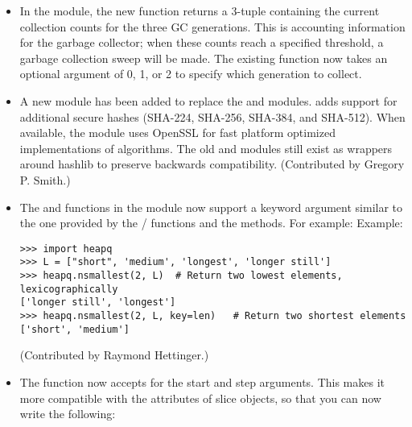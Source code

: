 \documentclass{howto}
\begin{document}
\begin{itemize}






\item In the  module, the new  function
returns a 3-tuple containing the current collection counts for the
three GC generations.  This is accounting information for the garbage
collector; when these counts reach a specified threshold, a garbage
collection sweep will be made.  The existing 
function now takes an optional  argument of 0, 1, or 2
to specify which generation to collect.

\item A new  module has been added to replace the
 and  modules.   adds support
for additional secure hashes (SHA-224, SHA-256, SHA-384, and SHA-512).
When available, the module uses OpenSSL for fast platform optimized
implementations of algorithms.  The old  and 
modules still exist as wrappers around hashlib to preserve backwards
compatibility.  (Contributed by Gregory P. Smith.)

\item The  and 
 functions in the  module 
now support a  keyword argument similar to the one
provided by the / functions
and the  methods.  For example:
Example:

\begin{verbatim}
>>> import heapq
>>> L = ["short", 'medium', 'longest', 'longer still']
>>> heapq.nsmallest(2, L)  # Return two lowest elements, lexicographically
['longer still', 'longest']
>>> heapq.nsmallest(2, L, key=len)   # Return two shortest elements
['short', 'medium']
\end{verbatim}

(Contributed by Raymond Hettinger.)

\item The  function now accepts
 for the start and step arguments.  This makes it more
compatible with the attributes of slice objects, so that you can now write
the following:


\end{itemize}
\end{document}
